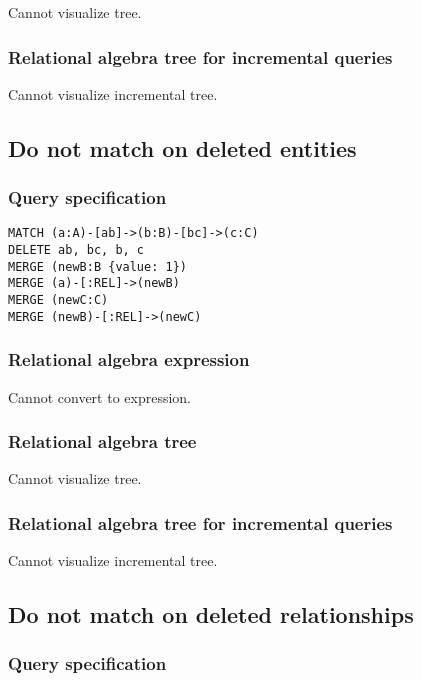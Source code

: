 Cannot visualize tree.

\subsubsection*{Relational algebra tree for incremental queries}

Cannot visualize incremental tree.

\subsection{Do not match on deleted entities}

\subsubsection*{Query specification}

\begin{lstlisting}
MATCH (a:A)-[ab]->(b:B)-[bc]->(c:C)
DELETE ab, bc, b, c
MERGE (newB:B {value: 1})
MERGE (a)-[:REL]->(newB)
MERGE (newC:C)
MERGE (newB)-[:REL]->(newC)
\end{lstlisting}

\subsubsection*{Relational algebra expression}

Cannot convert to expression.

\subsubsection*{Relational algebra tree}

Cannot visualize tree.

\subsubsection*{Relational algebra tree for incremental queries}

Cannot visualize incremental tree.

\subsection{Do not match on deleted relationships}

\subsubsection*{Query specification}

